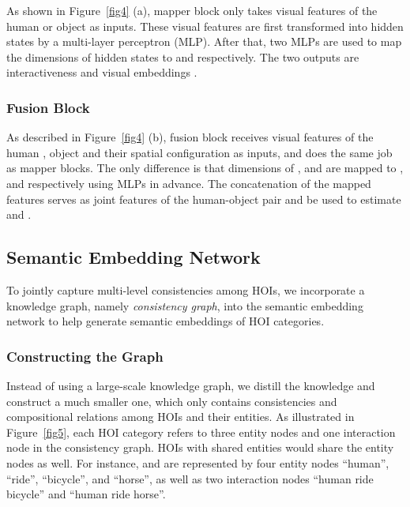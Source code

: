 \documentclass[sigconf,screen]{acmart}
\begin{document}
As shown in Figure~\ref{fig4} (a), mapper block only takes visual features of the human or object as inputs. These visual features are first transformed into hidden states by a multi-layer perceptron (MLP). After that, two MLPs are used to map the dimensions of hidden states to  and  respectively. The two outputs are interactiveness  and visual embeddings .

\subsubsection{Fusion Block}\label{3.2.2}

As described in Figure~\ref{fig4} (b), fusion block receives visual features of the human , object  and their spatial configuration  as inputs, and does the same job as mapper blocks. The only difference is that dimensions of ,  and  are mapped to ,  and  respectively using MLPs in advance. The concatenation of the mapped features serves as joint features of the human-object pair and be used to estimate  and .

\subsection{Semantic Embedding Network}

To jointly capture multi-level consistencies among HOIs, we incorporate a knowledge graph, namely \textit{consistency graph}, into the semantic embedding network to help generate semantic embeddings of HOI categories.

\subsubsection{Constructing the Graph}

Instead of using a large-scale knowledge graph, we distill the knowledge and construct a much smaller one, which only contains consistencies and compositional relations among HOIs and their entities. As illustrated in Figure~\ref{fig5}, each HOI category refers to three entity nodes and one interaction node in the consistency graph. HOIs with shared entities would share the entity nodes as well. For instance,  and  are represented by four entity nodes ``human'', ``ride'', ``bicycle'', and ``horse'', as well as two interaction nodes ``human ride bicycle'' and ``human ride horse''.
\end{document}
